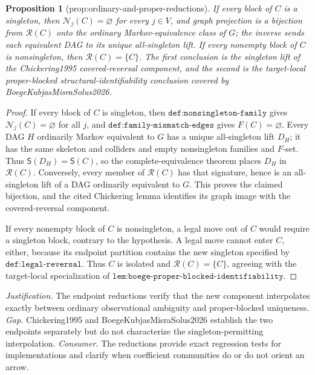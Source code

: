 \documentclass{article}
\newtheorem{proposition}{Proposition}
\begin{document}
\begin{proposition}[prop:ordinary-and-proper-reductions]\label{prop:ordinary-and-proper-reductions}
If every block of \(C\) is a singleton, then \(\mathcal N_j(C)=\varnothing\) for every \(j\in V\), and graph projection is a bijection from \(\mathcal R(C)\) onto the ordinary Markov-equivalence class of \(G\); the inverse sends each equivalent DAG to its unique all-singleton lift.  If every nonempty block of \(C\) is nonsingleton, then \(\mathcal R(C)=\{C\}\).  The first conclusion is the singleton lift of the Chickering1995 covered-reversal component, and the second is the target-local proper-blocked structural-identifiability conclusion covered by BoegeKubjasMisraSolus2026.
\end{proposition}
\begin{proof}
If every block of \(C\) is singleton, then \(\texttt{def:nonsingleton-family}\) gives \(\mathcal N_j(C)=\varnothing\) for all \(j\), and \(\texttt{def:family-mismatch-edges}\) gives \(F(C)=\varnothing\).  Every DAG \(H\) ordinarily Markov equivalent to \(G\) has a unique all-singleton lift \(D_H\); it has the same skeleton and colliders and empty nonsingleton families and \(F\)-set.  Thus \(\mathsf S(D_H)=\mathsf S(C)\), so the complete-equivalence theorem places \(D_H\) in \(\mathcal R(C)\).  Conversely, every member of \(\mathcal R(C)\) has that signature, hence is an all-singleton lift of a DAG ordinarily equivalent to \(G\).  This proves the claimed bijection, and the cited Chickering lemma identifies its graph image with the covered-reversal component.

If every nonempty block of \(C\) is nonsingleton, a legal move out of \(C\) would require a singleton block, contrary to the hypothesis.  A legal move cannot enter \(C\), either, because its endpoint partition contains the new singleton specified by \(\texttt{def:legal-reversal}\).  Thus \(C\) is isolated and \(\mathcal R(C)=\{C\}\), agreeing with the target-local specialization of \(\texttt{lem:boege-proper-blocked-identifiability}\).
\end{proof}
\par\smallskip\noindent \textit{Justification.} The endpoint reductions verify that the new component interpolates exactly between ordinary observational ambiguity and proper-blocked uniqueness. \textit{Gap.} Chickering1995 and BoegeKubjasMisraSolus2026 establish the two endpoints separately but do not characterize the singleton-permitting interpolation. \textit{Consumer.} The reductions provide exact regression tests for implementations and clarify when coefficient communities do or do not orient an arrow.
\end{document}
